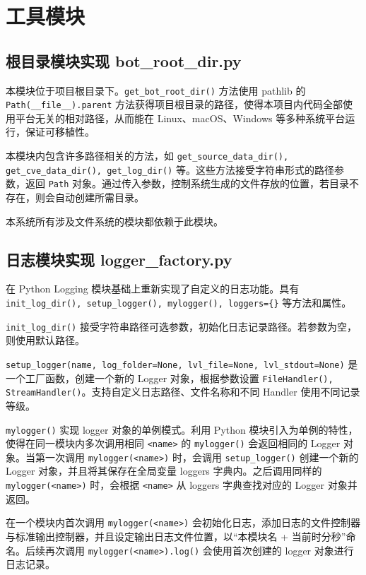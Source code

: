 \documentclass[a4paper,AutoFakeBold,oneside,12pt]{book}
\begin{document}
\section{工具模块}

\subsection{根目录模块实现 bot{\_}root{\_}dir.py}

本模块位于项目根目录下。\lstinline[style = python]|get_bot_root_dir()| 方法使用 pathlib 的 \lstinline[style = python]|Path(__file__).parent| 方法获得项目根目录的路径，使得本项目内代码全部使用平台无关的相对路径，从而能在 Linux、macOS、Windows 等多种系统平台运行，保证可移植性。

本模块内包含许多路径相关的方法，如 \lstinline|get_source_data_dir(), get_cve_data_dir(), get_log_dir()| 等。这些方法接受字符串形式的路径参数，返回 \lstinline|Path| 对象。通过传入参数，控制系统生成的文件存放的位置，若目录不存在，则会自动创建所需目录。

本系统所有涉及文件系统的模块都依赖于此模块。

\subsection{日志模块实现 logger{\_}factory.py}

在 Python Logging 模块基础上重新实现了自定义的日志功能。具有 \lstinline|init_log_dir(), setup_logger(), mylogger(), loggers={}| 等方法和属性。

\lstinline|init_log_dir()| 接受字符串路径可选参数，初始化日志记录路径。若参数为空，则使用默认路径。

\lstinline|setup_logger(name, log_folder=None, lvl_file=None, lvl_stdout=None)| 是一个工厂函数，创建一个新的 Logger 对象，根据参数设置 \lstinline|FileHandler(), StreamHandler()|。支持自定义日志路径、文件名称和不同 Handler 使用不同记录等级。

\lstinline[style = python]|mylogger()| 实现 logger 对象的单例模式\cite{singleton_design_pattern}。利用 Python 模块引入为单例的特性，使得在同一模块内多次调用相同 \lstinline[style = python]|<name>| 的 \lstinline[style = python]|mylogger()| 会返回相同的 Logger 对象。当第一次调用 \lstinline|mylogger(<name>)| 时，会调用 \lstinline|setup_logger()| 创建一个新的 Logger 对象，并且将其保存在全局变量 loggers 字典内。之后调用同样的 \lstinline|mylogger(<name>)| 时，会根据 \lstinline|<name>| 从 loggers 字典查找对应的 Logger 对象并返回。

在一个模块内首次调用 \lstinline[style = python]|mylogger(<name>)| 会初始化日志，添加日志的文件控制器与标准输出控制器，并且设定输出日志文件位置，以``本模块名 + 当前时分秒''命名。后续再次调用 \lstinline[style = python]|mylogger(<name>).log()| 会使用首次创建的 logger 对象进行日志记录。
\end{document}
